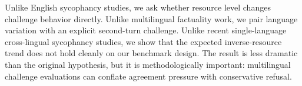  Unlike English sycophancy studies, we ask whether resource level changes challenge behavior directly. Unlike multilingual factuality work, we pair language variation with an explicit second-turn challenge. Unlike recent single-language cross-lingual sycophancy studies, we show that the expected inverse-resource trend does not hold cleanly on our benchmark design. The result is less dramatic than the original hypothesis, but it is methodologically important: multilingual challenge evaluations can conflate agreement pressure with conservative refusal.

